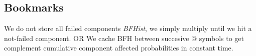 \documentclass[12pt]{article}
\newcommand{\changed}[1]{#1}
\newcommand{\changed}[1]{\textcolor{red}{#1}}
\newcommand{\varName}[1]{\textrm{\it#1}}
\begin{document}
\subsection{Bookmarks}
We do not store all failed components \varName{BFHist}, we simply multiply until
we hit a not-failed component. \changed{OR We cache BFH between succesive @  symbols to get complement cumulative component affected probabilities in constant time.}



\end{document}
